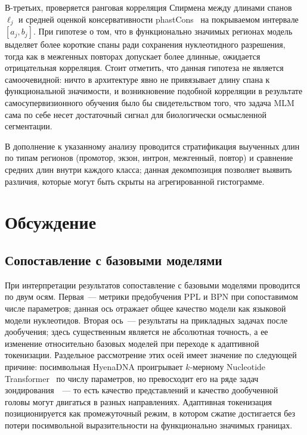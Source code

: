 В-третьих, проверяется ранговая корреляция Спирмена между длинами
спанов $\ell_j$ и средней оценкой консервативности
phastCons~\cite{siepelEvolutionarilyConservedElements2005} на
покрываемом интервале $[a_j, b_j]$. При гипотезе о том, что в
функционально значимых регионах модель выделяет более короткие спаны
ради сохранения нуклеотидного разрешения, тогда как в межгенных
повторах допускает более длинные, ожидается отрицательная корреляция.
Стоит отметить, что данная гипотеза не является самоочевидной:
ничто в архитектуре явно не привязывает длину спана к функциональной
значимости, и возникновение подобной корреляции в результате
самосупервизионного обучения было бы свидетельством того, что задача
MLM сама по себе несет достаточный сигнал для биологически
осмысленной сегментации.

В дополнение к указанному анализу проводится стратификация выученных
длин по типам регионов (промотор, экзон, интрон, межгенный, повтор) и
сравнение средних длин внутри каждого класса; данная декомпозиция
позволяет выявить различия, которые могут быть скрыты на агрегированной
гистограмме.

\section{Обсуждение}

\subsection{Сопоставление с базовыми моделями}

При интерпретации результатов сопоставление с базовыми моделями
проводится по двум осям. Первая~--- метрики предобучения PPL и BPN при
сопоставимом числе параметров; данная ось отражает общее качество
модели как языковой модели нуклеотидов. Вторая ось~--- результаты на
прикладных задачах после дообучения; здесь существенным является не
абсолютная точность, а ее изменение относительно базовых моделей при
переходе к адаптивной токенизации. Раздельное рассмотрение этих осей
имеет значение по следующей причине: посимвольная HyenaDNA проигрывает
$k$-мерному Nucleotide Transformer~\cite{dalla-torreNucleotideTransformerBuilding2025}
по числу параметров, но превосходит его на ряде задач
зондирования~\cite{vishniakovGenomicFoundationlessModels2024}~--- то
есть качество представлений и качество дообученной головы могут
двигаться в разных направлениях. Адаптивная токенизация позиционируется
как промежуточный режим, в котором сжатие достигается без потери
посимвольной выразительности на функционально значимых границах.

